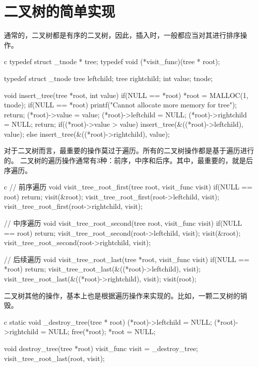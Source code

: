 \section{二叉树的简单实现}
通常的，二叉树都是有序的二叉树，因此，插入时，一般都应当对其进行排序操作。
\begin{code-block}{c}
typedef struct _tnode * tree;
typedef void (*visit_func)(tree * root);

typedef struct _tnode{
    tree leftchild;
    tree rightchild;
    int value;
}tnode;

void insert_tree(tree *root, int value){
    if(NULL == *root){
        *root = MALLOC(1, tnode);
        if(NULL == *root){
            printf("Cannot allocate more memory for tree\n");
            return;
        }
        (*root)->value = value;
        (*root)->leftchild = NULL;
        (*root)->rightchild = NULL;
        return;
    }
    if((*root)->value > value){
        insert_tree(&((*root)->leftchild), value);
    }else{
        insert_tree(&((*root)->rightchild), value);
    }
}
\end{code-block}

对于二叉树而言，最重要的操作莫过于遍历。所有的二叉树操作都是基于遍历进行的。
二叉树的遍历操作通常有3种：前序，中序和后序。其中，最重要的，就是后序遍历。

\begin{code-block}{c}
// 前序遍历
void visit_tree_root_first(tree root, visit_func visit){
    if(NULL == root){
        return;
    }
    visit(&root);
    visit_tree_root_first(root->leftchild, visit);
    visit_tree_root_first(root->rightchild, visit);
}

// 中序遍历
void visit_tree_root_second(tree root, visit_func visit){
    if(NULL == root){
        return;
    }
    visit_tree_root_second(root->leftchild, visit);
    visit(&root);
    visit_tree_root_second(root->rightchild, visit);
}

// 后续遍历
void visit_tree_root_last(tree *root, visit_func visit){
    if(NULL == *root){
        return;
    }
    visit_tree_root_last(&((*root)->leftchild), visit);
    visit_tree_root_last(&((*root)->rightchild), visit);
    visit(root);
}
\end{code-block}

二叉树其他的操作，基本上也是根据遍历操作来实现的。比如，一颗二叉树的销毁。
\begin{code-block}{c}
static void _destroy_tree(tree * root){
    (*root)->leftchild = NULL;
    (*root)->rightchild = NULL;
    free(*root);
    *root = NULL;
}

void destroy_tree(tree *root){
    visit_func visit = _destroy_tree;
    visit_tree_root_last(root, visit);
}
\end{code-block}

